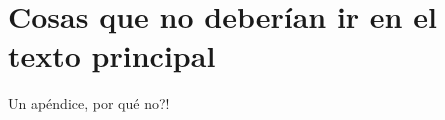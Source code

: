 \appendix

\chapter{Cosas que no deber\'ian ir en el texto principal}\label{Codigos}

Un ap\'endice, por qu\'e no?!